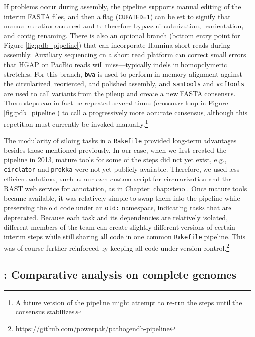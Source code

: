 If problems occur during assembly, the pipeline supports manual editing of the interim FASTA files, and then a flag (\texttt{CURATED=1}) can be set to signify that manual curation occurred and to therefore bypass circularization, reorientation, and contig renaming. There is also an optional branch (bottom entry point for Figure \ref{fig:pdb_pipeline}) that can incorporate Illumina short reads during assembly. Auxiliary sequencing on a short read platform can correct small errors that HGAP on PacBio reads will miss—typically indels in homopolymeric stretches. For this branch, \texttt{bwa}\autocite{Li2010b} is used to perform in-memory alignment against the circularized, reoriented, and polished assembly, and \texttt{samtools}\autocite{Li2009b} and \texttt{vcftools}\autocite{Danecek2011a} are used to call variants from the pileup and create a new FASTA consensus. These steps can in fact be repeated several times (crossover loop in Figure \ref{fig:pdb_pipeline}) to call a progressively more accurate consensus, although this repetition must currently be invoked manually.\footnote{A future version of the pipeline might attempt to re-run the steps until the consensus stabilizes.}

The modularity of siloing tasks in a \texttt{Rakefile} provided long-term advantages besides those mentioned previously. In our case, when we first created the pipeline in 2013, mature tools for some of the steps did not yet exist, e.g., \texttt{circlator} and \texttt{prokka} were not yet publicly available. Therefore, we used less efficient solutions, such as our own custom script for circularization and the RAST web service\autocite{Aziz2008} for annotation, as in Chapter \ref{chap:steno}. Once mature tools became available, it was relatively simple to swap them into the pipeline while preserving the old code under an \texttt{old:} namespace, indicating tasks that are deprecated. Because each task and its dependencies are relatively isolated, different members of the team can create slightly different versions of certain interim steps while still sharing all code in one common \texttt{Rakefile} pipeline. This was of course further reinforced by keeping all code under version control.\footnote{\url{https://github.com/powerpak/pathogendb-pipeline}}

\subsection{\pathogendbcomparison: Comparative analysis on complete genomes}

